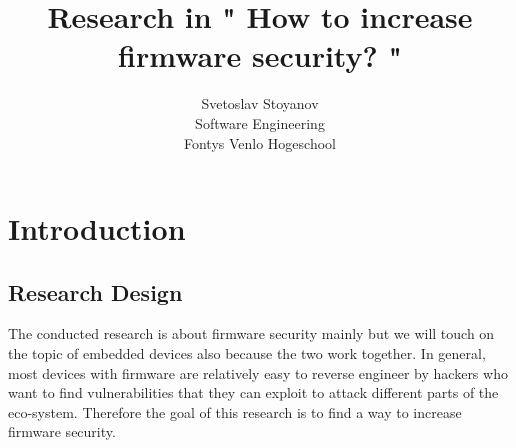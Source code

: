 \documentclass[]{report}
\title{Research in " How to increase firmware security? " }
\author{Svetoslav Stoyanov \\
	Software Engineering \\
	Fontys Venlo Hogeschool}
\begin{document}
\maketitle
\tableofcontents
\begin{comment} 
ABSTRACT
\end{comment}
\chapter{Introduction}
\section{Research Design}
The conducted research is about firmware security mainly but we will touch on the topic of embedded devices also because the two work together. In general, most devices with firmware are relatively easy to reverse engineer by hackers who want to find vulnerabilities that they can exploit to attack different parts of the eco-system. Therefore the goal of this research is to find a way to increase firmware security.
\end{document}
